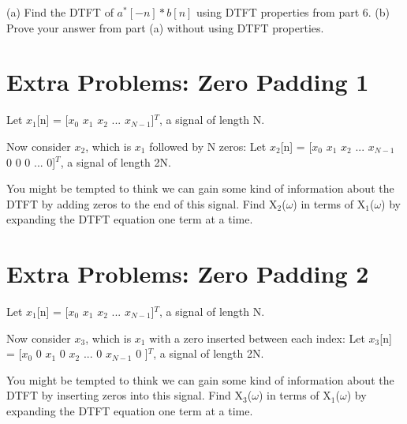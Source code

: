\documentclass[11pt]{article}
\begin{document}
(a) Find the DTFT of $a^{*}[-n] * b[n]$ using DTFT properties from part 6.\newline
(b) Prove your answer from part (a) without using DTFT properties.



\section{Extra Problems: Zero Padding 1}

Let $x_1$[n] = [$x_0$ $x_1$ $x_2$ ... $x_{N-1}$]$^{T}$, a signal of length N.\newline

Now consider $x_2$, which is $x_1$ followed by N zeros: \newline
Let $x_2$[n] = [$x_0$ $x_1$ $x_2$ ... $x_{N-1}$ 0 0 0 ... 0]$^{T}$, a signal of length 2N.\newline

You might be tempted to think we can gain some kind of information about the DTFT by adding zeros to the end of this signal. Find X$_2$($\omega$) in terms of X$_1$($\omega$) by expanding the DTFT equation one term at a time.

\vspace{4mm}

\section{Extra Problems: Zero Padding 2}

Let $x_1$[n] = [$x_0$ $x_1$ $x_2$ ... $x_{N-1}$]$^{T}$, a signal of length N.\newline

Now consider $x_3$, which is $x_1$ with a zero inserted between each index: \newline
Let $x_3$[n] = [$x_0$ 0 $x_1$ 0 $x_2$ ... 0 $x_{N-1}$ 0 ]$^{T}$, a signal of length 2N.\newline

You might be tempted to think we can gain some kind of information about the DTFT by inserting zeros into this signal. Find X$_3$($\omega$) in terms of X$_1$($\omega$) by expanding the DTFT equation one term at a time.
\end{document}
